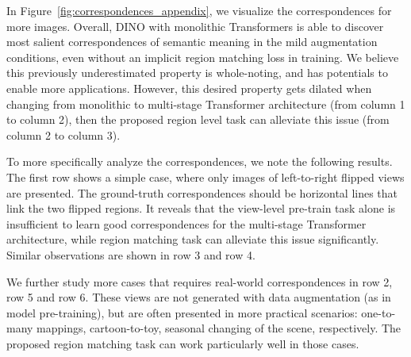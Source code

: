 \documentclass{article} \usepackage{iclr2022_conference,times}
\begin{document}
In Figure~\ref{fig:correspondences_appendix}, we visualize the correspondences for more images. Overall, DINO with monolithic Transformers is able to discover most salient correspondences of semantic meaning in the mild augmentation conditions, even without an implicit region matching loss in training. We believe this previously underestimated property is whole-noting, and has potentials to enable more applications. However, this desired property gets dilated when changing from monolithic to multi-stage Transformer architecture (from column 1 to column 2), then the proposed region level task can alleviate this issue (from column 2 to column 3).  

To more specifically analyze the correspondences, we note the following results. The first row shows a simple case, where only images of left-to-right flipped views are presented. The ground-truth correspondences should be horizontal lines that link the two flipped regions. It reveals that the view-level pre-train task alone is insufficient to learn good correspondences for the multi-stage Transformer architecture, while region matching task can alleviate this issue significantly. Similar observations are shown in row 3 and row 4.

We further study more cases that requires real-world correspondences in row 2, row 5 and row 6. These views are not generated with data augmentation (as in model pre-training), but are often presented in more practical scenarios: one-to-many mappings, cartoon-to-toy,  seasonal changing of the scene, respectively. The proposed region matching task can work particularly well in those cases.
\end{document}
